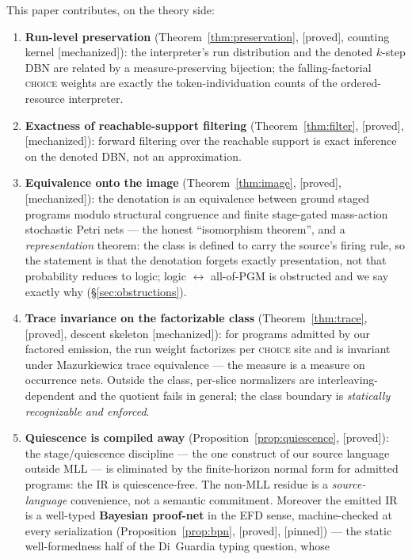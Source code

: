 \documentclass[11pt]{article}
\newcommand{\stproved}{[\textsf{proved}]}
\newcommand{\stmech}{[\textsf{mechanized}]}
\newcommand{\stpinned}{[\textsf{pinned}]}
\theoremstyle{plain}
\theoremstyle{definition}
\theoremstyle{remark}
\begin{document}
This paper contributes, on the theory side:
\begin{enumerate}[leftmargin=2em]
\item \textbf{Run-level preservation} (Theorem~\ref{thm:preservation},
  \stproved{}, counting kernel \stmech{}): the interpreter's run
  distribution and the denoted $k$-step DBN are related by a
  measure-preserving bijection; the falling-factorial \textsc{choice}
  weights are exactly the token-individuation counts of the
  ordered-resource interpreter.
\item \textbf{Exactness of reachable-support filtering}
  (Theorem~\ref{thm:filter}, \stproved{}, \stmech{}): forward filtering
  over the reachable support is exact inference on the denoted DBN, not
  an approximation.
\item \textbf{Equivalence onto the image} (Theorem~\ref{thm:image},
  \stproved{}, \stmech{}): the denotation is an equivalence between
  ground staged programs modulo structural congruence and finite
  stage-gated mass-action stochastic Petri nets --- the honest
  ``isomorphism theorem'', and a \emph{representation} theorem: the
  class is defined to carry the source's firing rule, so the statement
  is that the denotation forgets exactly presentation, not that
  probability reduces to logic; logic $\leftrightarrow$ all-of-PGM is
  obstructed and we say exactly why (\S\ref{sec:obstructions}).
\item \textbf{Trace invariance on the factorizable class}
  (Theorem~\ref{thm:trace}, \stproved{}, descent skeleton \stmech{}):
  for programs admitted by our factored emission, the run weight
  factorizes per \textsc{choice} site and is invariant under
  Mazurkiewicz trace equivalence --- the measure is a measure on
  occurrence nets. Outside the class, per-slice normalizers are
  interleaving-dependent and the quotient fails in general; the class
  boundary is \emph{statically recognizable and enforced}.
\item \textbf{Quiescence is compiled away}
  (Proposition~\ref{prop:quiescence}, \stproved{}): the stage/quiescence
  discipline --- the one construct of our source language outside MLL
  --- is eliminated by the finite-horizon normal form for admitted
  programs: the IR is quiescence-free. The non-MLL residue is a
  \emph{source-language} convenience, not a semantic commitment.
  Moreover the emitted IR is a well-typed \textbf{Bayesian proof-net} in
  the EFD sense, machine-checked at every serialization
  (Proposition~\ref{prop:bpn}, \stproved{}, \stpinned{}) --- the static
  well-formedness half of the Di~Guardia typing question, whose

\end{enumerate}
\end{document}
